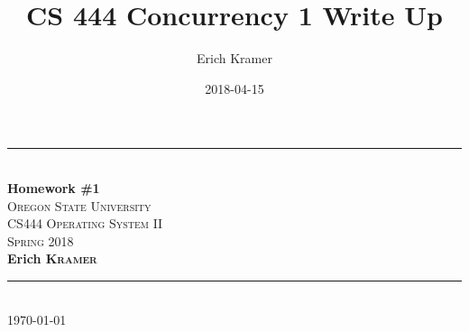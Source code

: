 \documentclass[letterpaper,10pt,notitlepage,fleqn]{article}
\title{CS 444 Concurrency 1 Write Up}
\date{2018-04-15}
\author{Erich Kramer}
\begin{document}
\begin{titlepage}
\vspace*{\fill}

\newcommand{\HRule}{\rule{\linewidth}{0.5mm}} %

\center %


\HRule \\[0.4cm]
{ \huge \bfseries Homework \#1}\\[0.4cm] %


\textsc{\LARGE Oregon State University}\\[0.5cm] %
\textsc{\Large CS444 Operating System II}\\[0.5cm] %
\textsc{\large Spring 2018}\\[0.5cm] %
        \noindent \textbf{Erich \textsc{Kramer}} \\ %

\HRule \\[1.5cm]

{\large \today}\\[3cm] %




\vfill %



\end{titlepage}
\end{document}
